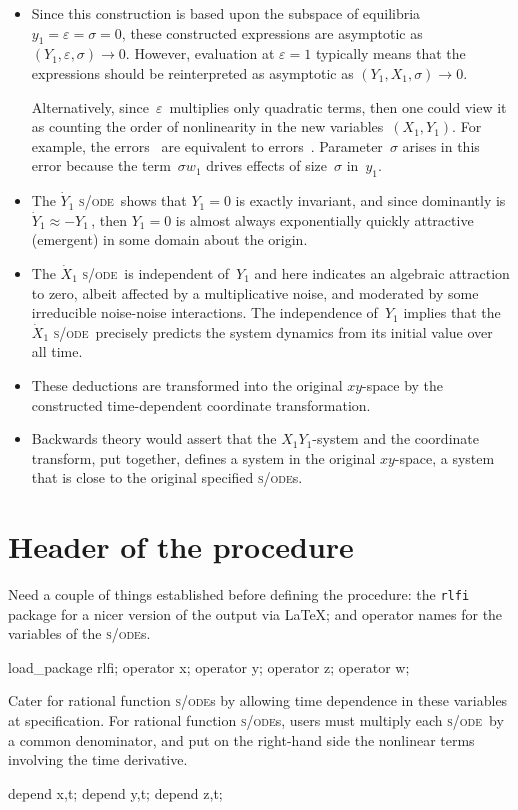 \documentclass[11pt,a5paper]{article}
\def\eps{\ensuremath{\varepsilon}}
\def\sde{\textsc{s/ode}}
\begin{document}
\begin{itemize}
\item Since this construction is based upon the subspace of
equilibria \(y_1=\eps=\sigma=0\), these constructed
expressions are asymptotic as \((Y_1,\eps,\sigma)\to0\). 
However, evaluation at \(\eps=1\) typically means that the
expressions should be reinterpreted as asymptotic  as
\((Y_1,X_1,\sigma)\to0\).

Alternatively, since~\eps\ multiplies only quadratic terms, 
then one could view it as counting the order of 
nonlinearity in the new variables~\((X_1,Y_1)\).  For 
example, the errors~\Ord{\eps^3} are equivalent to 
errors~.  Parameter~\(\sigma\) 
arises in this error because the term~\(\sigma w_1\) drives 
effects of size~\(\sigma\) in~\(y_1\).

\item The \(\dot Y_1\) \sde\ shows that \(Y_1=0\) is exactly
invariant, and since dominantly is \(\dot Y_1 \approx
-Y_1\)\,, then \(Y_1=0\) is almost always exponentially
quickly attractive (emergent) in some domain about the
origin.

\item The \(\dot X_1\) \sde\ is independent of~\(Y_1\) and
here indicates an algebraic attraction to zero, albeit
affected by a multiplicative noise, and moderated by some
irreducible noise-noise interactions.  The independence
of~\(Y_1\) implies that the \(\dot X_1\) \sde\ precisely
predicts the system dynamics from its initial value over all
time.

\item These deductions are transformed into the original
\(xy\)-space by the constructed time-dependent coordinate
transformation.

\item Backwards theory \cite[]{Roberts2018a} would assert
that the \(X_1Y_1\)-system and the coordinate transform, put
together, defines a system in the original \(xy\)-space, a
system that is close to the original specified \sde{}s.
\end{itemize}




\section{Header of the procedure}

Need a couple of things established before defining the
procedure: the \verb|rlfi| package for a nicer version of
the output via \LaTeX; and operator names for the variables
of the \sde{}s.
\begin{reduce}
load_package rlfi; 
operator x;
operator y;
operator z;
operator w;
\end{reduce}
Cater for rational function \sde{}s by allowing time
dependence in these variables at specification. For rational
function \sde{}s, users must multiply each \sde\ by a common
denominator, and put on the right-hand side the nonlinear
terms involving the time derivative.
\begin{reduce}
depend x,t;
depend y,t;
depend z,t;
\end{reduce}
\end{document}
